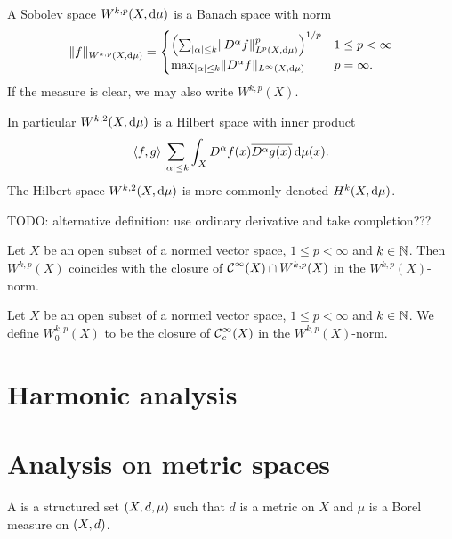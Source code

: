 \begin{proposition}
A Sobolev space $W^{k,p}(X,\operatorname{d \!}{\mu})$ is a Banach space with norm
\[ \lVert f\rVert_{W^{k,p}(X,\operatorname{d \!}{\mu})} = \begin{cases}
\left(\sum_{|\alpha|\leq k}\lVert D^\alpha f\rVert^p_{L^{p}(X, \operatorname{d \!}{\mu})}\right)^{1/p} & 1\leq p < \infty \\
\max_{|\alpha|\leq k} \lVert D^\alpha f\rVert_{L^{\infty}(X, \operatorname{d \!}{\mu})} & p = \infty.
\end{cases} \]
If the measure is clear, we may also write $W^{k,p}(X)$.

In particular $W^{k,2}(X, \operatorname{d \!}{\mu})$ is a Hilbert space with inner product
\[ \inner{f,g} \sum_{|\alpha| \leq k} \int_X D^\alpha f(x) \overline{D^\alpha g(x)}\diff{\mu(x)}. \]
The Hilbert space $W^{k,2}(X, \operatorname{d \!}{\mu})$ is more commonly denoted $H^k(X, \operatorname{d \!}{\mu})$.
\end{proposition}
TODO: alternative definition: use ordinary derivative and take completion???

\begin{proposition}
Let $X$ be an open subset of a normed vector space, $1\leq p < \infty$ and $k\in\mathbb{N}$. Then $W^{k,p}(X)$ coincides with the closure of $\operatorname{\mathcal{C}}^\infty(X) \cap W^{k,p}(X)$ in the $W^{k,p}(X)$-norm.
\end{proposition}

\begin{definition}
Let $X$ be an open subset of a normed vector space, $1\leq p < \infty$ and $k\in\mathbb{N}$. We define $W_0^{k,p}(X)$ to be the closure of $\operatorname{\mathcal{C}}^\infty_c(X)$ in the $W^{k,p}(X)$-norm.
\end{definition}


\chapter{Harmonic analysis}




\chapter{Analysis on metric spaces}
\begin{definition}
A  is a structured set $\sSet{X, d, \mu}$ such that $d$ is a metric on $X$ and $\mu$ is a Borel measure on $\sSet{X,d}$.
\end{definition}

